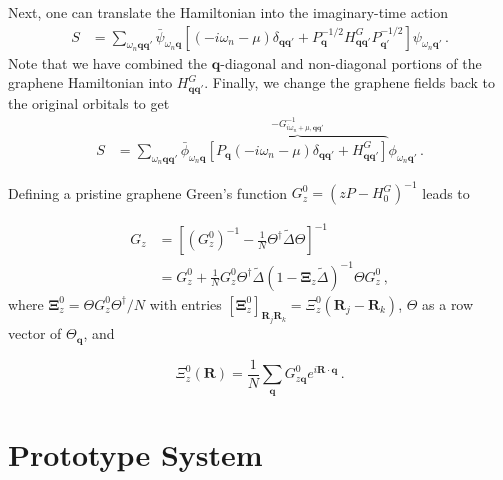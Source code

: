 \documentclass[aps, prb, superscriptaddress, preprint, floatfix]{revtex4-1}
\begin{document}
Next, one can translate the Hamiltonian into the imaginary-time action
%
\begin{align}
    S &= \sum_{\omega_n\mathbf{qq}'} \bar\psi_{\omega_n\mathbf{q}}
    \left[\left(-i\omega_n-\mu\right) \delta_{\mathbf{qq}'}
    + 
    P_\mathbf{q}^{-1/2}
    H^G_{\mathbf{qq}'} 
    P_{\mathbf{q}'}^{-1/2}
    \right]
    \psi_{\omega_n\mathbf{q}'}\,.
    \label{eqn:S}
\end{align}
%
Note that we have combined the $\mathbf{q}$-diagonal and non-diagonal portions of the graphene Hamiltonian into $ H^G_{\mathbf{qq}'}$. Finally, we change the graphene fields back to the original orbitals to get
%
\begin{align}
    S &= \sum_{\omega_n\mathbf{qq}'} \bar\phi_{\omega_n\mathbf{q}}
    \overbrace{
    \left[P_\mathbf{q}\left(-i\omega_n-\mu\right) \delta_{\mathbf{qq}'}
    + 
    H^G_{\mathbf{qq}'} \right]}^{-G^{-1}_{i\omega_n + \mu, \mathbf{qq}'}}
    \phi_{\omega_n\mathbf{q}'}\,.
    \label{eqn:S_2}
\end{align}
%

Defining a pristine graphene Green's function $G_{z}^0 = \left(zP - H^G_0\right)^{-1}$ leads to

%
\begin{align}
	G_{z} &= \left[\left(G_{z}^0\right)^{-1} - \frac{1}{N} \Theta^\dagger \tilde{\Delta}  \Theta\right]^{-1}
	\nonumber
	\\
	&=
	G_{z}^0
	+
	\frac{1}{N} G_{z}^0\Theta^\dagger \tilde{\Delta}
	\left( 1
	-
	 \boldsymbol{\Xi}_{z} \tilde{\Delta}
	\right)^{-1} \Theta G_{z}^0\,,	
\end{align}
%
where $\boldsymbol{\Xi}^0_{z} = \Theta G_{z}^0\Theta^\dagger / N$ with entries $\left[\boldsymbol{\Xi}^0_{z}\right]_{\mathbf{R}_j\mathbf{R}_k} = \Xi_{z}^0\left(\mathbf{R}_j - \mathbf{R}_k\right)$, $\Theta$ as a row vector of $\Theta_\mathbf{q}$, and

%
\begin{equation}
    \Xi_z^0\left(\mathbf{R}\right) = \frac{1}{N}\sum_\mathbf{q}G_{z\mathbf{q}}^0
    e^{i \mathbf{R} \cdot\mathbf{q}}\,.
    \label{eqn:Xi}
\end{equation}
%


	
\section{Prototype System}
\end{document}
